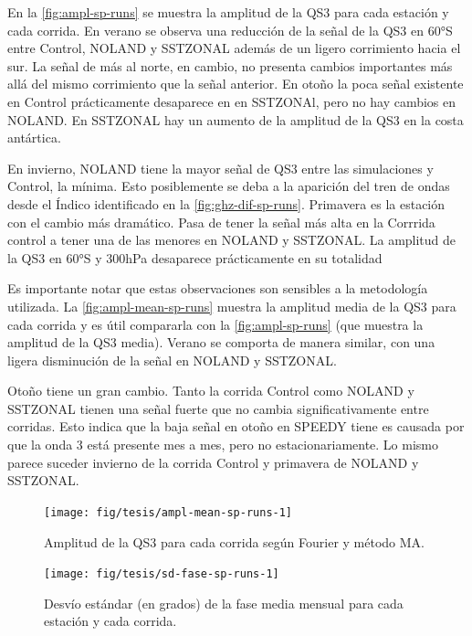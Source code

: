 \documentclass[spanish,a4paper,12pt,oneside]{book}
\begin{document}
En la \autoref{fig:ampl-sp-runs} se muestra la amplitud de la QS3 para
cada estación y cada corrida. En verano se observa una reducción de la
señal de la QS3 en 60°S entre Control, NOLAND y SSTZONAL además de un
ligero corrimiento hacia el sur. La señal de más al norte, en cambio, no
presenta cambios importantes más allá del mismo corrimiento que la señal
anterior. En otoño la poca señal existente en Control prácticamente
desaparece en en SSTZONAl, pero no hay cambios en NOLAND. En SSTZONAL
hay un aumento de la amplitud de la QS3 en la costa antártica.

En invierno, NOLAND tiene la mayor señal de QS3 entre las simulaciones y
Control, la mínima. Esto posiblemente se deba a la aparición del tren de
ondas desde el Índico identificado en la \autoref{fig:ghz-dif-sp-runs}.
Primavera es la estación con el cambio más dramático. Pasa de tener la
señal más alta en la Corrrida control a tener una de las menores en
NOLAND y SSTZONAL. La amplitud de la QS3 en 60°S y 300hPa desaparece
prácticamente en su totalidad

Es importante notar que estas observaciones son sensibles a la
metodología utilizada. La \autoref{fig:ampl-mean-sp-runs} muestra la
amplitud media de la QS3 para cada corrida y es útil compararla con la
\autoref{fig:ampl-sp-runs} (que muestra la amplitud de la QS3 media).
Verano se comporta de manera similar, con una ligera disminución de la
señal en NOLAND y SSTZONAL.

Otoño tiene un gran cambio. Tanto la corrida Control como NOLAND y
SSTZONAL tienen una señal fuerte que no cambia significativamente entre
corridas. Esto indica que la baja señal en otoño en SPEEDY tiene es
causada por que la onda 3 está presente mes a mes, pero no
estacionariamente. Lo mismo parece suceder invierno de la corrida
Control y primavera de NOLAND y SSTZONAL.

\begin{landscape}\begin{figure}

{\centering \texttt{[image: fig/tesis/ampl-mean-sp-runs-1]} 

}

\caption{Amplitud de la QS3 para cada corrida según Fourier y método MA.}\label{fig:ampl-mean-sp-runs}
\end{figure}
\end{landscape}

\begin{figure}
\texttt{[image: fig/tesis/sd-fase-sp-runs-1]} \caption{Desvío estándar (en grados) de la fase media mensual para cada estación y cada corrida.}\label{fig:sd-fase-sp-runs}
\end{figure}
\end{document}
